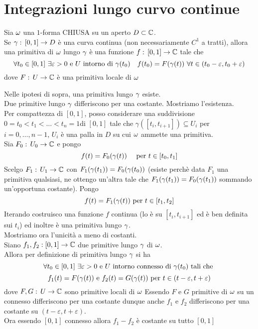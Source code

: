 \section{Integrazioni lungo curvo continue}
\begin{defn}Sia $\omega$ una $1$-forma CHIUSA su un aperto $D\subset\mathbb{C}$.\\
Se $\gamma:\, [0,1]\to D$ \`e una curva continua (non necessariamente $C^1$ a tratti), allora una primitiva di $\omega$ lungo $\gamma$ \`e una funzione $f:\, [0,1]\to \mathbb{C}$ tale che 
$$\forall t_0\in [0,1] \, \, \exists \varepsilon>0 \text{ e } U \text{ intorno di } \gamma(t_0) \quad f(t_0) = F(\gamma(t)) \, \, \forall t \in (t_0-\varepsilon,t_0+\varepsilon)$$
dove $F:\, U \to \mathbb{C}$ \`e una primitiva locale di $\omega$
\end{defn}
\begin{prop}Nelle ipotesi di sopra, una primitiva lungo $\gamma$ esiste.\\
Due primitive lungo $\gamma$ differiscono per una costante.
\proof Mostriamo l'esistenza.\\
Per compattezza di $[0,1]$, posso considerare una suddivisione $0=t_0<t_1<\dots <t_n=1$di $[0,1]$ tale che $\gamma([t_i,t_{i+1}])\subseteq U_i$ per $i=0, \dots, n-1$, $U_i$ \`e una palla in $D$ su cui $\omega$ ammette una primitiva.\\
Sia  $F_0:\, U_0\to \mathbb{C}$ e pongo 
$$f(t) =F_0(\gamma(t))\quad \text{ per } t\in [t_0,t_1]$$
Scelgo $F_1:\, U_1 \to \mathbb{C}$ con $F_1(\gamma(t_1))=F_0(\gamma(t_0))$ (esiste perch\`e data $F_1$ una primitiva qualsiasi, ne ottengo un'altra tale che $F_1(\gamma(t_1))=F_0(\gamma(t_1))$ sommando un'opportuna costante). Pongo 
$$f(t) = F_1(\gamma(t))\text{ per } t\in [t_1, t_2]$$
Iterando costruisco una funzione $f$ continua (lo \`e su $[t_i,t_{i+1}]$ ed \`e ben definita sui $t_i$) ed inoltre \`e una primitiva lungo $\gamma$.\\
Mostriamo ora l'unicit\`a a meno di costanti.\\
Siano $f_1,f_2:[0,1]\to \mathbb{C}$ due primitive lungo $\gamma$ di $\omega$.\\
Allora per definizione di primitiva lungo $\gamma$ si ha 
$$\forall t_0\in[0,1]\, \, \exists\varepsilon>0 \text{ e } U \text{ intorno connesso di } \gamma(t_0) \text{ tali che } $$
$$f_1(t) = F(\gamma(t)) \text{ e } f_2(t) =G(\gamma(t))\text{ per } t \in (t-\varepsilon, t+\varepsilon)$$ dove $F,G:\, U\to \mathbb{C}$ sono primitive locali di $\omega$ 
Essendo $F$ e $G$ primitive di $\omega$  su un connesso  differiscono per una costante dunque anche $f_1$ e $f_2$ differiscono per una costante su $(t-\varepsilon, t+\varepsilon)$.\\
Ora essendo $[0,1]$ connesso allora $f_1-f_2$ \`e costante su tutto $[0,1]$
\end{prop}
